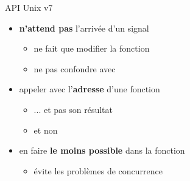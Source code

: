 \begin {frame} {API Unix v7}
  
    \begin {block} {}
    \begin {itemize}
	\item {} \textbf {n'attend pas} l'arrivée d'un signal
	    \begin {itemize}
		\item ne fait que modifier la fonction
		\item ne pas confondre avec 
	    \end {itemize}
	\item appeler  avec l'\textbf {adresse} d'une fonction
	    \begin {itemize}
		\item ... et pas son résultat
		\item {} et non
	    \end {itemize}
	\item en faire \textbf {le moins possible} dans la fonction
	    \begin {itemize}
		\item évite les problèmes de concurrence
	    \end {itemize}
    \end {itemize}
    \end {block}
\end {frame}



